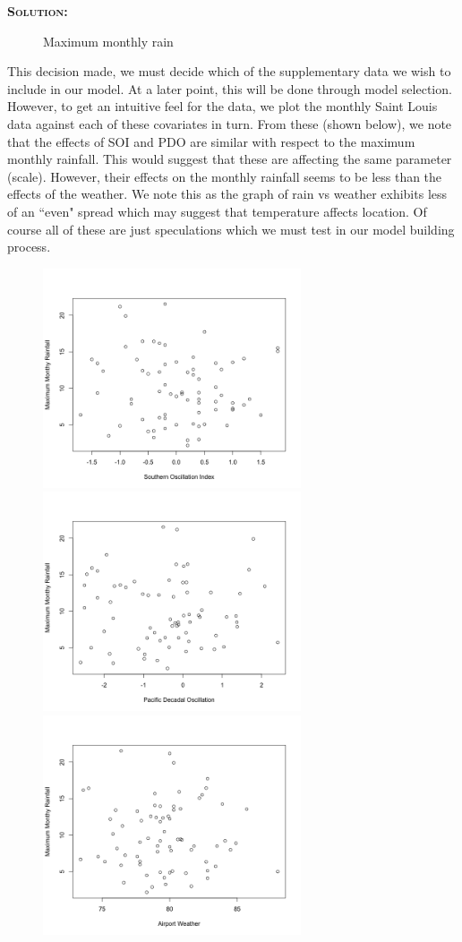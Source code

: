 \documentclass[12pt,oneside]{article}
\newenvironment{solution}
    {\textbf{\textsc{Solution:}}\\}
    {\newpage}
\begin{document}
\begin{solution}
\begin{figure}[H]
\begin{center}
\caption{Maximum monthly rain}
\end{center}
\end{figure}
\noindent This decision made, we must decide which of the supplementary data we wish to include in our model. At a later point, this will be done through model selection. However, to get an intuitive feel for the data, we plot the monthly Saint Louis data against each of these covariates in turn. From these (shown below), we note that the effects of SOI and PDO are similar with respect to the maximum monthly rainfall. This would suggest that these are affecting the same parameter (scale). However, their effects on the monthly rainfall seems to be less than the effects of the weather. We note this as the graph of rain vs weather exhibits less of an ``even" spread which may suggest that temperature affects location. Of course all of these are just speculations which we must test in our model building process.
\begin{figure}[H]
\begin{center}
{\includegraphics[width=3in]{Assignments/a3/rain-vs-soi.png}}
{\includegraphics[width=3in]{Assignments/a3/rain-vs-pdo.png}}
{\includegraphics[width=3in]{Assignments/a3/rain-vs-temp.png}}

\end{center}
\end{figure}
\end{solution}
\end{document}

